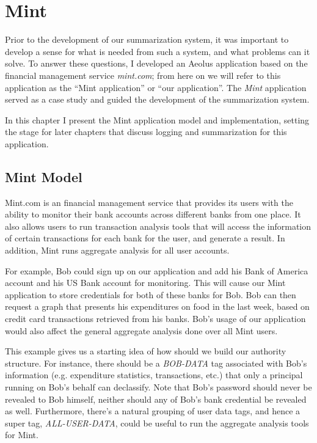 \chapter{Mint}\label{mint}

Prior to the development of our summarization system, it was important to develop a sense for what is needed from such a system, and what problems can it solve. To answer these questions, I developed an Aeolus application based on the financial management service \emph{mint.com}; from here on we will refer to this application as the ``Mint application'' or ``our application''. The \emph{Mint} application served as a case study and guided the development of the summarization system.

In this chapter I present the Mint application model and implementation, setting the stage for later chapters that discuss logging and summarization for this application.

\section{Mint Model}

Mint.com is an financial management service that provides its users with the ability to monitor their bank accounts across different banks from one place. It also allows users to run transaction analysis tools that will access the information of certain transactions for each bank for the user, and generate a result. In addition, Mint runs aggregate analysis for all user accounts.

For example, Bob could sign up on our application and add his Bank of America account and his US Bank account for monitoring. This will cause our Mint application to store credentials for both of these banks for Bob. Bob can then request a graph that presents his expenditures on food in the last week, based on credit card transactions retrieved from his banks. Bob's usage of our application would also affect the general aggregate analysis done over all Mint users.

This example gives us a starting idea of how should we build our authority structure. For instance, there should be a \emph{BOB-DATA} tag associated with Bob's information (e.g. expenditure statistics, transactions, etc.) that only a principal running on Bob's behalf can declassify. Note that Bob's password should never be revealed to Bob himself, neither should any of Bob's bank credential be revealed as well. Furthermore, there's a natural grouping of user data tags, and hence a super tag, \emph{ALL-USER-DATA}, could be useful to run the aggregate analysis tools for Mint.

